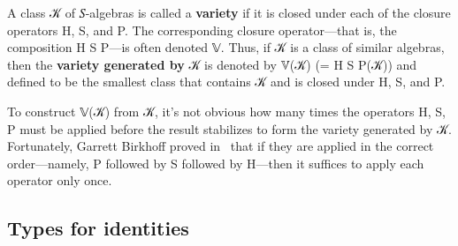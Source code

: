 \documentclass[a4paper,USenglish,cleveref,autoref,thm-restate]{lipics-v2019}
\begin{document}

A class \AB 𝒦 of \AB 𝑆-algebras is called a \textbf{variety} if it is closed under each of the closure operators \AF H, \AF S, and \AF P. The corresponding closure operator---that is, the composition \AF H \AF S \AF P---is often denoted \AF 𝕍. Thus, if \AB 𝒦 is a class of similar algebras, then the \textbf{variety generated by} \AB 𝒦 is denoted by \AF 𝕍(\AB 𝒦) (= \AF H \AF S \AF P(\AB 𝒦)) and defined to be the smallest class that contains \AF 𝒦 and is closed under \AF H, \AF S, and \AF P.

To construct \AF 𝕍(\AB 𝒦) from \AB 𝒦, it's not obvious how many times the operators \AF H, \AF S, \AF P must be applied before the result stabilizes to form the variety generated by \AB 𝒦. Fortunately, Garrett Birkhoff proved in~\cite{Birkhoff:1935} that if they are applied in the correct order---namely, \AF P followed by \AF S followed by \AF H---then it suffices to apply each operator only once.

\subsection{Types for identities}\label{sec:types-for-identities}

\end{document}
